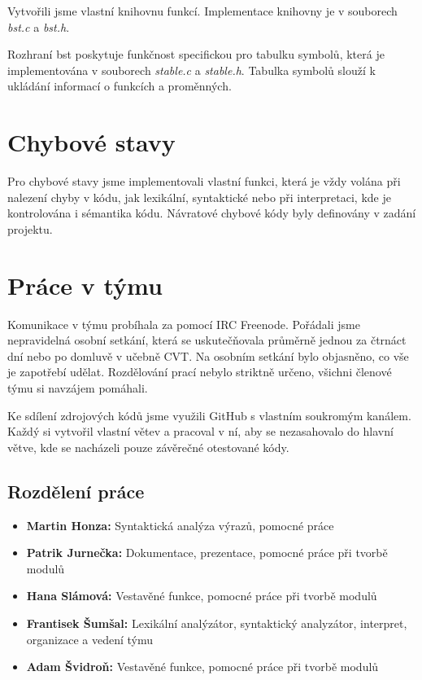 \documentclass[a4paper, 11pt, titlepage]{article}
\begin{document}
Vytvořili jsme vlastní knihovnu funkcí. Implementace knihovny je v souborech \textit{bst.c} a \textit{bst.h}. 

Rozhraní bst poskytuje funkčnost specifickou pro tabulku symbolů, která je implementována v souborech \textit{stable.c} a \textit{stable.h}. Tabulka symbolů slouží k ukládání informací o funkcích a proměnných.

\section{Chybové stavy}
Pro chybové stavy jsme implementovali vlastní funkci, která je vždy volána při nalezení chyby v kódu, jak lexikální, syntaktické nebo při interpretaci, kde je kontrolována i sémantika kódu. Návratové chybové kódy byly definovány v zadání projektu. 
 

\newpage

\section{Práce v týmu}
Komunikace v týmu probíhala za pomocí IRC Freenode. Pořádali jsme nepravidelná osobní setkání, která se uskutečňovala průměrně jednou za čtrnáct dní nebo po domluvě v učebně CVT. Na osobním setkání bylo objasněno, co vše je zapotřebí udělat. Rozdělování prací nebylo striktně určeno, všichni členové týmu si navzájem pomáhali.    

Ke sdílení zdrojových kódů jsme využili GitHub s vlastním soukromým kanálem. Každý si vytvořil vlastní větev a pracoval v ní, aby se nezasahovalo do hlavní větve, kde se nacházeli pouze závěrečné otestované kódy.  

\subsection{Rozdělení práce}

\begin{itemize}
	\item\textbf{Martin Honza:} Syntaktická analýza výrazů, pomocné práce
	\item\textbf{Patrik Jurnečka:} Dokumentace, prezentace, pomocné práce při tvorbě modulů
	\item\textbf{Hana Slámová:} Vestavěné funkce, pomocné práce při tvorbě modulů
	\item\textbf{Frantisek Šumšal:} Lexikální analýzátor, syntaktický analyzátor, interpret, organizace a vedení týmu
	\item\textbf{Adam Švidroň:} Vestavěné funkce, pomocné práce při tvorbě modulů
\end{itemize}  
\end{document}
